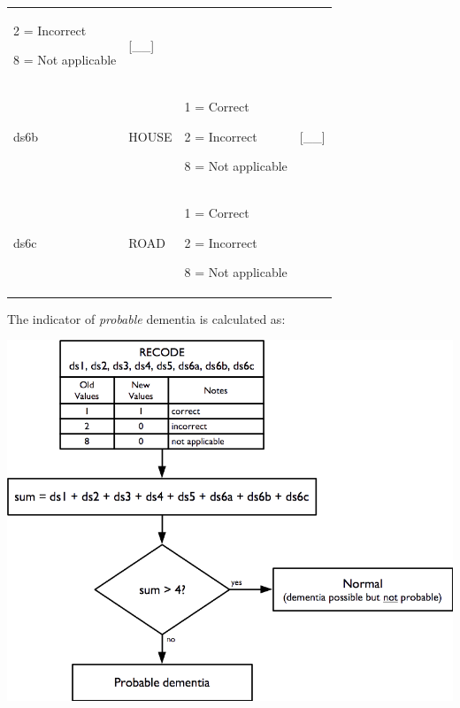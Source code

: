 \documentclass[12pt,a4paper]{book}
\theoremstyle{definition}
\theoremstyle{definition}
\theoremstyle{definition}
\theoremstyle{remark}
\begin{document}
\begin{longtable}[]{@{}llll@{}}
\begin{minipage}[t]{0.24\columnwidth}
2 = Incorrect

8 = Not applicable\strut
\end{minipage} & \begin{minipage}[t]{0.24\columnwidth}\raggedright
{[}\_\_{]}\strut
\end{minipage}\tabularnewline
\begin{minipage}[t]{0.24\columnwidth}\raggedright
ds6b\strut
\end{minipage} & \begin{minipage}[t]{0.24\columnwidth}\raggedright
HOUSE\strut
\end{minipage} & \begin{minipage}[t]{0.24\columnwidth}\raggedright
1 = Correct

2 = Incorrect

8 = Not applicable\strut
\end{minipage} & \begin{minipage}[t]{0.24\columnwidth}\raggedright
{[}\_\_{]}\strut
\end{minipage}\tabularnewline
\begin{minipage}[t]{0.24\columnwidth}\raggedright
ds6c\strut
\end{minipage} & \begin{minipage}[t]{0.24\columnwidth}\raggedright
ROAD\strut
\end{minipage} & \begin{minipage}[t]{0.24\columnwidth}\raggedright
1 = Correct

2 = Incorrect

8 = Not applicable\strut
\end{minipage} & \begin{minipage}[t]{0.24\columnwidth}\raggedright
\strut
\end{minipage}\tabularnewline
\bottomrule
\end{longtable}

The indicator of \emph{probable} dementia is calculated as:

\begin{center}\includegraphics{figures/indicators20} \end{center}
\end{document}
